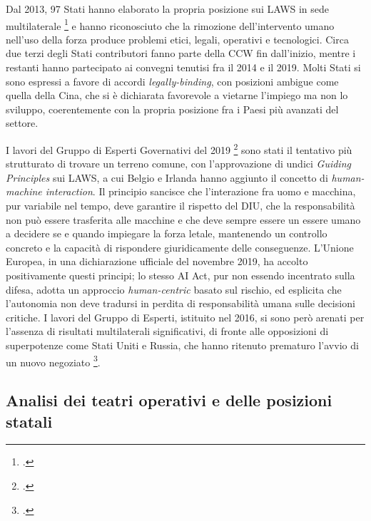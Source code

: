 \ifstampa\documentclass[a4paper,12pt,twoside,openright]{report}\else\documentclass[a4paper,12pt]{report}\fi
\newif\ifrevisione \revisionefalse
\DeclareRobustCommand{\rev}[1]{\ifrevisione{\color{blue!65!black}#1}\else#1\fi}
\begin{document}
Dal 2013, 97 Stati hanno elaborato la propria posizione sui LAWS in sede
multilaterale \footcite[p.~29]{wareham_2020} e hanno riconosciuto che la rimozione
dell'intervento umano nell'uso della forza produce problemi etici, legali,
operativi e tecnologici. Circa due terzi degli Stati contributori fanno parte della CCW
fin dall'inizio, mentre i restanti hanno partecipato ai convegni tenutisi fra il
2014 e il 2019. Molti Stati si sono espressi a favore di accordi
\textit{legally-binding}, con posizioni ambigue come quella della Cina, che \rev{si è dichiarata favorevole a vietarne l'impiego ma non lo sviluppo}, coerentemente
con la propria posizione fra i Paesi più avanzati del settore.
 
I lavori del Gruppo di Esperti Governativi del 2019 \footcite{ccw_2019} sono
stati il tentativo più strutturato di trovare un terreno comune, con
l'approvazione di undici \textit{Guiding Principles} sui LAWS, a cui Belgio e
Irlanda hanno aggiunto il concetto di \textit{human-machine interaction}. Il
principio sancisce che l'interazione fra uomo e macchina, pur variabile nel
tempo, deve garantire il rispetto del DIU, che la responsabilità non può essere
trasferita alle macchine e che deve sempre essere un essere umano a decidere se
e quando impiegare la forza letale, mantenendo un controllo concreto e la
capacità di rispondere giuridicamente delle conseguenze. L'Unione Europea, in
una dichiarazione ufficiale del novembre 2019, ha accolto positivamente questi
principi; lo stesso AI Act, pur non essendo incentrato sulla difesa, adotta un
approccio \textit{human-centric} basato sul rischio, ed esplicita che
l'autonomia non deve tradursi in perdita di responsabilità umana sulle decisioni
critiche. \rev{I lavori del Gruppo di Esperti, istituito nel 2016, si sono però arenati}
per l'assenza di risultati multilaterali significativi, di fronte alle
opposizioni di superpotenze come Stati Uniti e Russia, che hanno ritenuto
\rev{prematuro l'avvio di un nuovo negoziato} \footcite{ccw_2019}.
 
\subsection{Analisi dei teatri operativi e delle posizioni statali}
 
\end{document}
